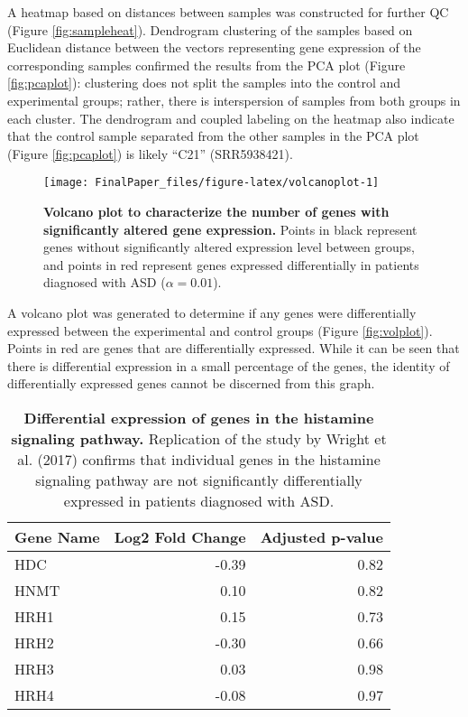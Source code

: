 A heatmap based on distances between samples was constructed for further
QC (Figure \ref{fig:sampleheat}). Dendrogram clustering of the samples
based on Euclidean distance between the vectors representing gene
expression of the corresponding samples confirmed the results from the
PCA plot (Figure \ref{fig:pcaplot}): clustering does not split the
samples into the control and experimental groups; rather, there is
interspersion of samples from both groups in each cluster. The
dendrogram and coupled labeling on the heatmap also indicate that the
control sample separated from the other samples in the PCA plot (Figure
\ref{fig:pcaplot}) is likely ``C21'' (SRR5938421).

\begin{Schunk}
\begin{figure}
\texttt{[image: FinalPaper\_files/figure-latex/volcanoplot-1]} \caption{\label{fig:volplot}\textbf{Volcano plot to characterize the number of genes with significantly altered gene expression.} Points in black represent genes without significantly altered expression level between groups, and points in red represent genes expressed differentially in patients diagnosed with ASD ($\alpha=0.01$).}\label{fig:volcanoplot}
\end{figure}
\end{Schunk}

A volcano plot was generated to determine if any genes were
differentially expressed between the experimental and control groups
(Figure \ref{fig:volplot}). Points in red are genes that are
differentially expressed. While it can be seen that there is
differential expression in a small percentage of the genes, the identity
of differentially expressed genes cannot be discerned from this graph.

\begin{table}[ht]
\centering
\begin{tabular}{lrr}
  \hline
Gene Name & Log2 Fold Change & Adjusted p-value \\ 
  \hline
HDC & -0.39 & 0.82 \\ 
  HNMT & 0.10 & 0.82 \\ 
  HRH1 & 0.15 & 0.73 \\ 
  HRH2 & -0.30 & 0.66 \\ 
  HRH3 & 0.03 & 0.98 \\ 
  HRH4 & -0.08 & 0.97 \\ 
   \hline
\end{tabular}
\caption{\textbf{Differential expression of genes in the histamine signaling pathway.} Replication of the study by Wright et al. (2017) confirms that individual genes in the histamine signaling pathway are not significantly differentially expressed in patients diagnosed with ASD.} 
\label{tbl:histgenes}
\end{table}


